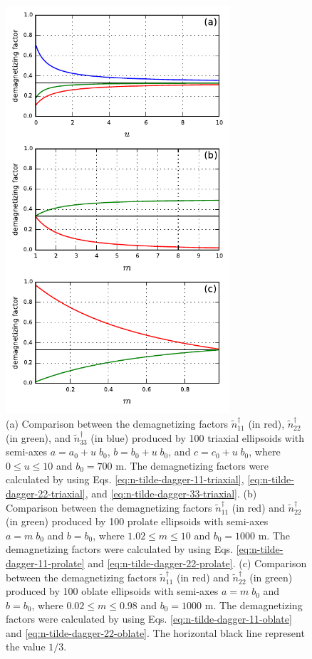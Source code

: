 \documentclass[gmd, manuscript]{copernicus}
\begin{document}
\begin{figure}[t]
\includegraphics[width=8.3cm]{figures/demag_factors.pdf}
\caption{(a) Comparison between the demagnetizing factors
$\tilde{n}^{\dagger}_{11}$ (in red),
$\tilde{n}^{\dagger}_{22}$ (in green), and
$\tilde{n}^{\dagger}_{33}$ (in blue)
produced by 100 triaxial ellipsoids with semi-axes
$a = a_{0} + u \; b_{0}$, $b = b_{0} + u \; b_{0}$, and
$c = c_{0} + u \; b_{0}$, where $0 \leq u \leq 10$ and
$b_{0} = 700$ \unit{m}.
The demagnetizing factors were calculated
by using Eqs. \ref{eq:n-tilde-dagger-11-triaxial},
\ref{eq:n-tilde-dagger-22-triaxial}, and \ref{eq:n-tilde-dagger-33-triaxial}.
(b) Comparison between the demagnetizing factors
$\tilde{n}^{\dagger}_{11}$ (in red) and
$\tilde{n}^{\dagger}_{22}$ (in green)
produced by 100 prolate ellipsoids with semi-axes
$a = m \; b_{0}$ and $b = b_{0}$, where $1.02 \leq m \leq 10$ and
$b_{0} = 1000$ \unit{m}.
The demagnetizing factors were calculated
by using Eqs. \ref{eq:n-tilde-dagger-11-prolate} and
\ref{eq:n-tilde-dagger-22-prolate}.
(c) Comparison between the demagnetizing factors
$\tilde{n}^{\dagger}_{11}$ (in red) and
$\tilde{n}^{\dagger}_{22}$ (in green)
produced by 100 oblate ellipsoids with semi-axes
$a = m \; b_{0}$ and $b = b_{0}$, where $0.02 \leq m \leq 0.98$ and
$b_{0} = 1000$ \unit{m}.
The demagnetizing factors were calculated
by using Eqs. \ref{eq:n-tilde-dagger-11-oblate} and
\ref{eq:n-tilde-dagger-22-oblate}.
The horizontal black line represent the value $1/3$.}
\label{fig:demag-factors}
\end{figure}
\end{document}
